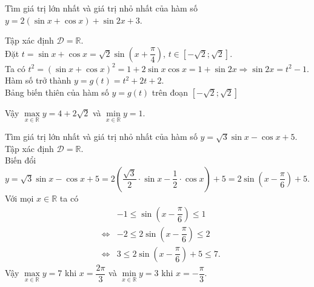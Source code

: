 \begin{ex}%
    Tìm giá trị lớn nhất và giá trị nhỏ nhất của hàm số  $y=2(\sin x+\cos x)+\sin 2 x+3$.
    \loigiai
    {Tập xác định $\mathscr{D}=\mathbb{R}$.\\
        Đặt $t=\sin x+ \cos x=\sqrt{2}\sin \left(x+\dfrac{\pi}{4}\right)$, $t\in \left[-\sqrt{2};\sqrt{2}\right]$.\\
        Ta có $t^2=\left(\sin x+ \cos x\right)^2=1+2\sin x\cos x=1+\sin 2x\Rightarrow \sin 2x =t^2-1$.\\
        Hàm số trở thành $y=g(t)=t^2+2t+2$. \\
        Bảng biến thiên của hàm số $y=g(t)$ trên đoạn $ \left[-\sqrt{2};\sqrt{2}\right]$
        \begin{center}
        \end{center}
        Vậy $\max\limits_{x \in \mathbb{R}} y=4+2\sqrt{2}$ và $\min\limits_{x \in \mathbb{R}} y=1$.
    }
\end{ex}

\begin{ex}%
    Tìm giá trị lớn nhất và giá trị nhỏ nhất của hàm số $y=\sqrt{3} \sin x-\cos x+5$.
    \loigiai
    {
        Tập xác định $\mathscr{D}=\mathbb{R}$.\\
        Biến đổi $y=\sqrt{3} \sin x-\cos x+5=2\left(\dfrac{\sqrt{3}}{2}\cdot\sin x-\dfrac{1}{2}\cdot\cos x\right)+5=2\sin\left(x-\dfrac{\pi}{6}\right)+5$.\\
        Với mọi $x\in \mathbb{R}$ ta có
        \allowdisplaybreaks
        \begin{eqnarray*}
            & & -1\leq \sin\left(x-\dfrac{\pi}{6}\right)\leq 1\\
            &\Leftrightarrow& -2\leq 2\sin\left(x-\dfrac{\pi}{6}\right)\leq 2\\
            &\Leftrightarrow&3\leq  2\sin\left(x-\dfrac{\pi}{6}\right)+5\leq 7.
        \end{eqnarray*}
        Vậy $\max\limits_{x \in \mathbb{R}} y=7$ khi $x=\dfrac{2\pi}{3}$ và $\min\limits_{x \in \mathbb{R}} y=3$ khi $x=-\dfrac{\pi}{3}$.
    }
\end{ex}
